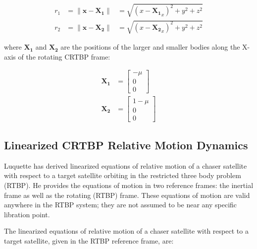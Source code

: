 \documentclass[a4paper]{article}
\begin{document}
\begin{equation*}
\begin{aligned}
r_1 &= \| \mathbf{x} - \mathbf{X_1} \| &= \sqrt{(x-\mathbf{X_1}_x)^2 + y^2 + z^2} \\
r_2 &= \| \mathbf{x} - \mathbf{X_2} \| &= \sqrt{(x-\mathbf{X_2}_x)^2 + y^2 + z^2}
\end{aligned}
\end{equation*}

where \(\mathbf{X_1}\) and \(\mathbf{X_2}\) are the positions of the larger and smaller bodies along the X-axis of the rotating CRTBP frame:

\begin{equation*}
\begin{aligned}
\mathbf{X_1} &= \begin{bmatrix}
						-\mu \\ 0 \\ 0 
						\end{bmatrix} \\
\mathbf{X_2} &= \begin{bmatrix}
						1 - \mu \\ 0 \\ 0
						\end{bmatrix}
\end{aligned}
\end{equation*}


\subsection{Linearized CRTBP Relative Motion Dynamics}
Luquette \cite{luquette2004} has derived linearized equations of relative motion of a chaser satellite with respect to a target satellite orbiting in the restricted three body problem (RTBP).  He provides the equations of motion in two reference frames: the inertial frame as well as the rotating (RTBP) frame.  These equations of motion are valid anywhere in the RTBP system; they are not assumed to be near any specific libration point.

The linearized equations of relative motion of a chaser satellite with respect to a target satellite, given in the RTBP reference frame, are:


\end{document}
